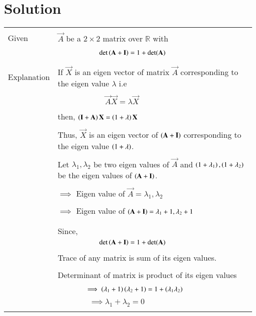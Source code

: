 \documentclass[journal,12pt]{IEEEtran}
\begin{document}
\section{\textbf{Solution}}
\renewcommand{\thetable}{1}
\begin{longtable}{|p{5cm}|p{13cm}|}
\hline
    \multirow{3}{*}{Given} 
    &\\
     & $\vec{A}$ be a $2\times2$ matrix over $\mathbb{R}$ with\\
     &\\
      &$\qquad\qquad \qquad \det\left(\mathbf{A}+\mathbf{I}\right)=1+\det(\mathbf{A})$\\
      &\\
     \hline
     \multirow{3}{*}{Explanation} &\\
     & If $\vec{X}$ is an eigen vector of matrix $\vec{A}$
     corresponding to the eigen value $\lambda$ i.e \\
     &\\
     & $\qquad\qquad\qquad\vec{A}\vec{X}=\lambda\vec{X}$\\
     &\\
     & then, $\left(\mathbf{I}+\mathbf{A}\right)\mathbf{X}=\left(1+\lambda\right)\mathbf{X}$\\
     &\\
     &Thus, $\vec{X}$ is an eigen vector of $\left(\mathbf{A}+\mathbf{I}\right)$ corresponding to the eigen value $\left(1+\lambda\right)$.\\
     
     &\\
     
     & Let $\lambda_1,\lambda_2$ be two eigen values of $\vec{A}$ and $\left(1+\lambda_1\right),\left(1+\lambda_2\right)$ be the eigen values of $\left(\mathbf{A}+\mathbf{I}\right).$\\
    &\\
    & $\implies$ Eigen value of $\vec{A}=\lambda_1,\lambda_2$\\
    &\\
    &  $\implies$ Eigen value of $\left(\mathbf{A}+\mathbf{I}\right) = \lambda_1+1,\lambda_2+1$\\
    &\\
    \hline
    &\\
    & Since,\\
    &$\qquad\qquad \qquad \det\left(\mathbf{A}+\mathbf{I}\right)=1+\det(\mathbf{A})$\\
    &\\
     & Trace of any matrix is sum of its eigen values. \\
    &\\
    & Determinant of matrix is product of its eigen values \\
    &\\
    & $\qquad\qquad\implies \left(\lambda_1+1\right)\left(\lambda_2+1\right)=1+\left(\lambda_1\lambda_2\right)$\\
    &\\
    &$\qquad\qquad\implies\boxed{ \lambda_1+\lambda_2 = 0}$\\
    &\\
   

\end{longtable}
\end{document}
